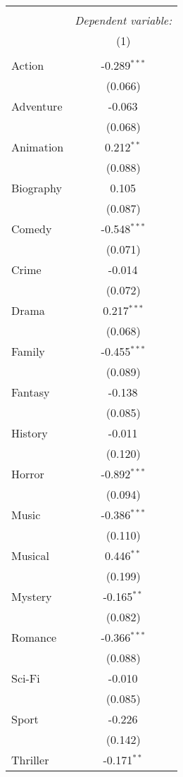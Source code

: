 \begin{table}[!htbp] \centering
\begin{tabular}{@{\extracolsep{5pt}}lc}
\\[-1.8ex]\hline
\hline \\[-1.8ex]
& \multicolumn{1}{c}{\textit{Dependent variable:}} \
\cr \cline{1-2}
\\[-1.8ex] & (1) \\
\hline \\[-1.8ex]
 Action & -0.289$^{***}$ \\
  & (0.066) \\
 Adventure & -0.063$^{}$ \\
  & (0.068) \\
 Animation & 0.212$^{**}$ \\
  & (0.088) \\
 Biography & 0.105$^{}$ \\
  & (0.087) \\
 Comedy & -0.548$^{***}$ \\
  & (0.071) \\
 Crime & -0.014$^{}$ \\
  & (0.072) \\
 Drama & 0.217$^{***}$ \\
  & (0.068) \\
 Family & -0.455$^{***}$ \\
  & (0.089) \\
 Fantasy & -0.138$^{}$ \\
  & (0.085) \\
 History & -0.011$^{}$ \\
  & (0.120) \\
 Horror & -0.892$^{***}$ \\
  & (0.094) \\
 Music & -0.386$^{***}$ \\
  & (0.110) \\
 Musical & 0.446$^{**}$ \\
  & (0.199) \\
 Mystery & -0.165$^{**}$ \\
  & (0.082) \\
 Romance & -0.366$^{***}$ \\
  & (0.088) \\
 Sci-Fi & -0.010$^{}$ \\
  & (0.085) \\
 Sport & -0.226$^{}$ \\
  & (0.142) \\
 Thriller & -0.171$^{**}$ \\

\end{tabular}
\end{table}
